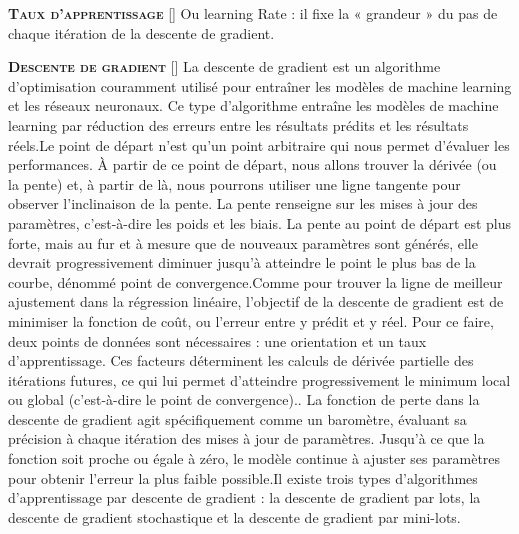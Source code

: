 \documentclass[10pt,french]{report}
\newcommand{\cube}{\raisebox{0.13ex}{\scalebox{0.75}{ $\blacksquare$ }}}
\newcommand{\entreelex}[3][]{%
	{\large \textbf{\textsc{#2}}} %
	\if\relax\detokenize{#1}\relax %
	\else %
	\raisebox{0.15ex}{\scalebox{0.7}{$\Diamond$}} %
	[#1] %
	\fi
	\raisebox{0.13ex}{\scalebox{0.75}{$\blacksquare$}} #3 %
}
\begin{document}
	\label{taux apprentissag}
	\entreelex{Taux d'apprentissage}{Ou learning Rate : il fixe la « grandeur » du pas de chaque itération de la descente de gradient.}

	\entreelex{Descente de gradient}{La descente de gradient est un algorithme d’optimisation couramment utilisé pour entraîner les modèles de machine learning et les réseaux neuronaux. Ce type d’algorithme entraîne les modèles de machine learning par réduction des erreurs entre les résultats prédits et les résultats réels.\cube Le point de départ n'est qu'un point arbitraire qui nous permet d'évaluer les performances. À partir de ce point de départ, nous allons trouver la dérivée (ou la pente) et, à partir de là, nous pourrons utiliser une ligne tangente pour observer l'inclinaison de la pente. La pente renseigne sur les mises à jour des paramètres, c'est-à-dire les poids et les biais. La pente au point de départ est plus forte, mais au fur et à mesure que de nouveaux paramètres sont générés, elle devrait progressivement diminuer jusqu'à atteindre le point le plus bas de la courbe, dénommé point de convergence.\cube Comme pour trouver la ligne de meilleur ajustement dans la régression linéaire, l'objectif de la descente de gradient est de minimiser la fonction de coût, ou l'erreur entre y prédit et y réel. Pour ce faire, deux points de données sont nécessaires : une orientation et un taux d'apprentissage. Ces facteurs déterminent les calculs de dérivée partielle des itérations futures, ce qui lui permet d'atteindre progressivement le minimum local ou global (c'est-à-dire le point de convergence).. La fonction de perte dans la descente de gradient agit spécifiquement comme un baromètre, évaluant sa précision à chaque itération des mises à jour de paramètres. Jusqu'à ce que la fonction soit proche ou égale à zéro, le modèle continue à ajuster ses paramètres pour obtenir l'erreur la plus faible possible.\cube Il existe trois types d'algorithmes d'apprentissage par descente de gradient : la descente de gradient par lots, la descente de gradient stochastique et la descente de gradient par mini-lots.}

	\listoffigures

    \printbibliography
\end{document}
